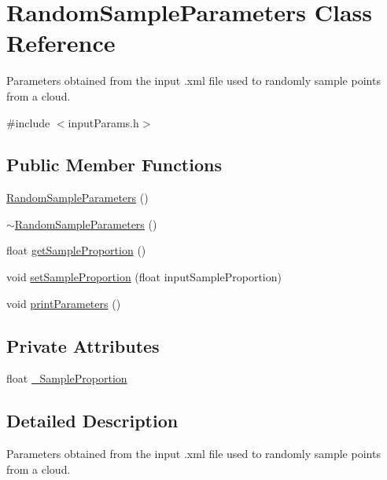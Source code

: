 \hypertarget{classRandomSampleParameters}{\section{Random\-Sample\-Parameters Class Reference}
\label{classRandomSampleParameters}
}


Parameters obtained from the input .xml file used to randomly sample points from a cloud.  




{\ttfamily \#include $<$input\-Params.\-h$>$}

\subsection*{Public Member Functions}
\begin{DoxyCompactItemize}
\item 
\hyperlink{classRandomSampleParameters_a8c6d613eede7a6fe956d685af5775c36}{Random\-Sample\-Parameters} ()
\item 
\hyperlink{classRandomSampleParameters_a2984e2a93377c72d9627230d74799330}{$\sim$\-Random\-Sample\-Parameters} ()
\item 
float \hyperlink{classRandomSampleParameters_a0acbbb8bdf2b1d1e35cf319a609e0dc7}{get\-Sample\-Proportion} ()
\item 
void \hyperlink{classRandomSampleParameters_a53e1dec1e3bef64dbdad07342f299ab3}{set\-Sample\-Proportion} (float input\-Sample\-Proportion)
\item 
void \hyperlink{classRandomSampleParameters_adc63f88273135ccabd7b12edd4c0ecc4}{print\-Parameters} ()
\end{DoxyCompactItemize}
\subsection*{Private Attributes}
\begin{DoxyCompactItemize}
\item 
float \hyperlink{classRandomSampleParameters_acae54fe4b8743efb653cb341307a3c4c}{\-\_\-\-Sample\-Proportion}
\end{DoxyCompactItemize}


\subsection{Detailed Description}
Parameters obtained from the input .xml file used to randomly sample points from a cloud. 

